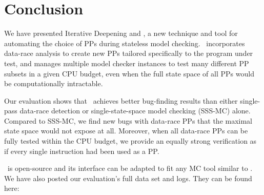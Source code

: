 \documentclass[pldi]{sigplanconf-pldi15}
\begin{document}







\section{Conclusion}
\label{sec:conclusion}


We have presented Iterative Deepening and \quicksand, a new technique and tool for automating the choice of PPs during stateless model checking.
\quicksand~incorporates data-race analysis to create new PPs tailored specifically to the program under test,
and manages multiple model checker instances to test many different PP subsets in a given CPU budget, even when the full state space of all PPs would be computationally intractable.

Our evaluation shows that \quicksand~achieves better bug-finding results than either single-pass data-race detection or single-state-space model checking (SSS-MC) alone.
Compared to SSS-MC,
we find new bugs with data-race PPs that the maximal state space would not expose at all.
Moreover, when all data-race PPs can be fully tested within the CPU budget, we provide an equally strong verification as if every single instruction had been used as a PP.

\quicksand~is open-source and its interface can be adapted to fit any MC tool similar to \landslide.
We have also posted our evaluation's full data set and logs.
They can be found here:

\end{document}
